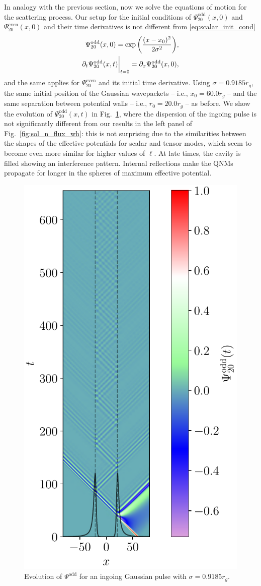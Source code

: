 \documentclass[article,aps,nofootinbib,twocolumn,superscriptaddress]{revtex4-1}
\begin{document}
In analogy with the previous section, now we solve the equations of motion for the scattering process. Our setup for the initial conditions of $\Psi_{20}^{\mathrm{odd}}(x,0)$ and $\Psi_{20}^{\mathrm{even}}(x,0)$ and their time derivatives is not different from \eqref{eq:scalar_init_cond}  
\begin{align}
\displaystyle{\Psi^{\mathrm{odd}}_{20}(x,0)=\exp\left(\frac{(x-x_0)^2}{2\sigma^2}\right)},\nonumber\\
\displaystyle{\partial_t \Psi^{\mathrm{odd}}_{20}(x,t)\bigg{|}_{t=0}=\partial_x\Psi^{\mathrm{odd}}_{20}(x,0)},
\label{eq:tensor_init_cond}
\end{align}
and the same applies for $\Psi^\mathrm{even}_{20}$ and its initial time derivative. Using $\sigma=0.9185r_g$, the same initial position of the Gaussian wavepackets -- i.e., $x_0=60.0r_g$ -- and the same separation between potential walls -- i.e., $r_0=20.0r_g$ -- as before. We show the evolution of $\Psi_{20}^{\mathrm{odd}}(x,t)$ in Fig.~\ref{fig:even_evolve}, where the dispersion of the ingoing pulse is not significantly different from our results in the left panel of Fig.~\ref{fig:sol_n_flux_wh}: this is not surprising due to the similarities between the shapes of the effective potentials for scalar and tensor modes, which seem to become even more similar for higher values of $\ell$. At late times, the cavity is filled showing an interference pattern. Internal reflections make the QNMs propagate for longer in the spheres of maximum effective potential.

\begin{figure}[t!]
\centering
\includegraphics[width=.4\textwidth]{figures/odd_wh_l_2.pdf}
\caption{\label{fig:even_evolve} Evolution of $\Psi^{\mathrm{odd}}$ for an ingoing Gaussian pulse with $\sigma=0.9185r_g$.}
\end{figure}
\end{document}
